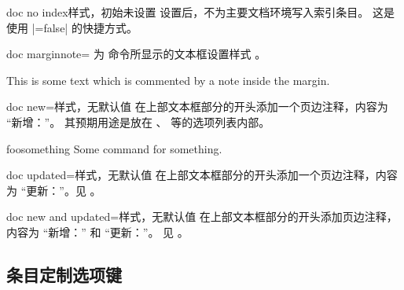 \begin{docTcbKey}[][doc new={2020-04-22}]{doc no index}{}{样式，初始未设置}
  设置后，不为主要文档环境写入索引条目。
  这是使用 |=false| 的快捷方式。
\end{docTcbKey}

\clearpage


\begin{docTcbKey}[][doc new=2014-09-19]{doc marginnote}{=}{\tcbdocdescInitEmpty}
  为  命令所显示的文本框设置样式 。
\begin{dispExample}
%
This is some text
which is commented by a note inside the margin.
\end{dispExample}
\end{docTcbKey}

\begin{docTcbKey}[][doc new=2014-09-19]{doc new}{=}{样式，无默认值}
  在上部文本框部分的开头添加一个页边注释，内容为
  \enquote{新增：}。
  其预期用途是放在 、 等的选项列表内部。
  \makeatletter\renewcommand*{\tcbdocnew}[1]{\kvtcb@text@new: #1}\makeatother%
\begin{dispExample}
\begin{docCommand}[doc new=2000-01-01]{foosomething}{}
Some command for something.
\end{docCommand}
\end{dispExample}
\end{docTcbKey}


\begin{docTcbKey}[][doc new=2014-09-19]{doc updated}{=}{样式，无默认值}
  在上部文本框部分的开头添加一个页边注释，内容为
  \enquote{更新：}。见 。
\end{docTcbKey}


\begin{docTcbKey}[][doc new=2014-09-19]{doc new and updated}{=}{样式，无默认值}
  在上部文本框部分的开头添加页边注释，内容为
  \enquote{新增：} 和 \enquote{更新：}。
  见 。
\end{docTcbKey}



\clearpage
\subsection{条目定制选项键}


